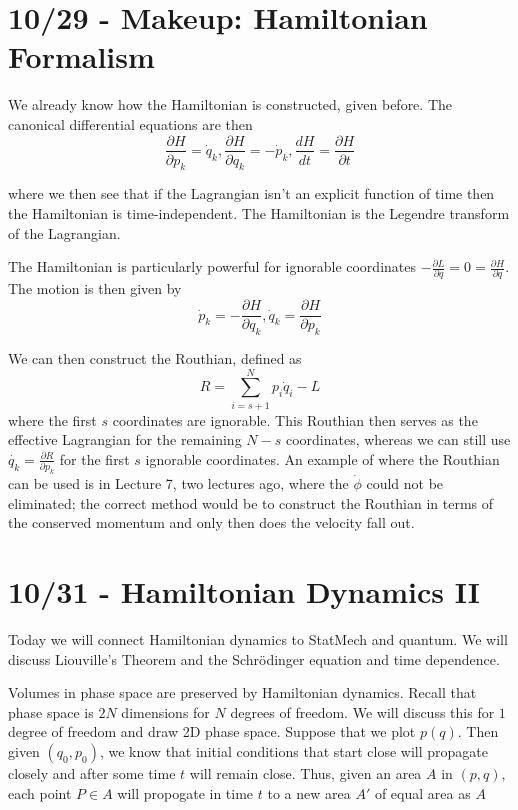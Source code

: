 \documentclass[10pt]{report}
\newcommand{\rd}[2]{\frac{d#1}{d#2}}
\newcommand{\pd}[2]{\frac{\partial #1}{\partial#2}}
\begin{document}
\chapter{10/29 - Makeup: Hamiltonian Formalism}

We already know how the Hamiltonian is constructed, given before. The canonical differential equations are then
$$\pd{H}{p_k} = \dot{q}_k, \pd{H}{q_k} = -\dot{p}_k, \rd{H}{t} = \pd{H}{t}$$

where we then see that if the Lagrangian isn't an explicit function of time then the Hamiltonian is time-independent. The Hamiltonian is the Legendre transform of the Lagrangian.

The Hamiltonian is particularly powerful for ignorable coordinates $-\pd{L}{q} = 0 = \pd{H}{q}$. The motion is then given by
$$\dot{p}_k = -\pd{H}{q_k}, \dot{q}_k = \pd{H}{p_k}$$

We can then construct the Routhian, defined as
$$R = \sum_{i=s+1}^N p_i \dot{q}_i - L$$
where the first $s$ coordinates are ignorable. This Routhian then serves as the effective Lagrangian for the remaining $N-s$ coordinates, whereas we can still use $\dot{q_k} = \pd{R}{p_k}$ for the first $s$ ignorable coordinates. An example of where the Routhian can be used is in Lecture 7, two lectures ago, where the $\dot{\phi}$ could not be eliminated; the correct method would be to construct the Routhian in terms of the conserved momentum and only then does the velocity fall out.
\chapter{10/31 - Hamiltonian Dynamics II}

Today we will connect Hamiltonian dynamics to StatMech and quantum. We will discuss Liouville's Theorem and the Schr\"odinger equation and time dependence.

Volumes in phase space are preserved by Hamiltonian dynamics. Recall that phase space is $2N$ dimensions for $N$ degrees of freedom. We will discuss this for $1$ degree of freedom and draw 2D phase space. Suppose that we plot $p(q)$. Then given $(q_0,p_0)$, we know that initial conditions that start close will propagate closely and after some time $t$ will remain close. Thus, given an area $A$ in $(p,q)$, each point $P \in A$ will propogate in time $t$ to a new area $A'$ of equal area as $A$
\end{document}
